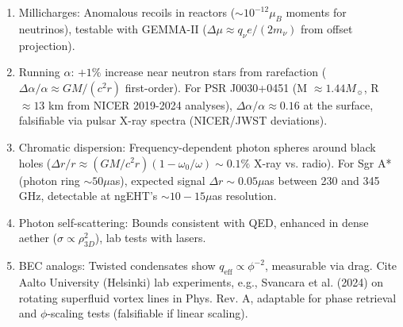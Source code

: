 \documentclass{article}
\begin{document}
\begin{enumerate}
\item Millicharges: Anomalous recoils in reactors ($\sim 10^{-12} \mu_B$ moments for neutrinos), testable with GEMMA-II ($\Delta \mu \approx q_\nu e / (2 m_\nu)$ from offset projection).
\item Running $\alpha$: $+1\%$ increase near neutron stars from rarefaction ($\Delta \alpha / \alpha \approx G M / (c^2 r)$ first-order). For PSR J0030+0451 (M $\approx 1.44 M_\sun$, R $\approx 13$ km from NICER 2019-2024 analyses), $\Delta \alpha / \alpha \approx 0.16$ at the surface, falsifiable via pulsar X-ray spectra (NICER/JWST deviations).
\item Chromatic dispersion: Frequency-dependent photon spheres around black holes ($\Delta r / r \approx (G M / c^2 r) (1 - \omega_0 / \omega) \sim 0.1\%$ X-ray vs. radio). For Sgr A* (photon ring $\sim 50 \mu$as), expected signal $\Delta r \sim 0.05 \mu$as between 230 and 345 GHz, detectable at ngEHT's $\sim 10-15 \mu$as resolution.
\item Photon self-scattering: Bounds consistent with QED, enhanced in dense aether ($\sigma \propto \rho_{3D}^2$), lab tests with lasers.
\item BEC analogs: Twisted condensates show $q_{\text{eff}} \propto \phi^{-2}$, measurable via drag. Cite Aalto University (Helsinki) lab experiments, e.g., Svancara et al. (2024) on rotating superfluid vortex lines in Phys. Rev. A, adaptable for phase retrieval and $\phi$-scaling tests (falsifiable if linear scaling).
\end{enumerate}
\end{document}
